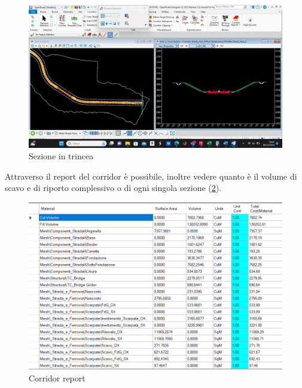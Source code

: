 \begin{figure}[H]
    \includegraphics[width=\textwidth]{Figures/sezione in trincea.jpg}
      \caption{Sezione in trincea}
      \label{sezione in trincea}
\end{figure}

Attraverso il report del corridor è possibile, inoltre vedere quanto è il volume di scavo e di riporto complessivo o di ogni singola sezione (\ref{Corridorreport}).

\begin{figure}[H]
    \includegraphics[width=\textwidth]{Figures/Corridor report.png}
      \caption{Corridor report}
      \label{Corridorreport}
\end{figure}

